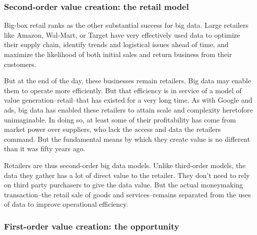 \documentclass[12pt]{article}
\begin{document}
\subsubsection{Second-order value creation: the retail model}
\label{sec:second-order-value}


Big-box retail ranks as the other substantial success for big
data. Large retailers like Amazon, Wal-Mart, or Target have very
effectively used data to optimize their supply chain, identify trends
and logistical issues ahead of time, and maximize the likelihood of
both initial sales and return business from their customers. 

But at the end of the day, these businesses remain retailers. Big data
may enable them to operate more efficiently. But that efficiency is in
service of a model of value generation--retail--that has existed for a
very long time. As with Google and ads, big data has enabled these
retailers to attain scale and complexity heretofore unimaginable. In
doing so, at least some of their profitability has come from market
power over suppliers, who lack the access and data the retailers
command. But the fundamental means by which they create value is no
different than it was fifty years ago.

Retailers are thus second-order big data models. Unlike third-order
models, the data they gather has a lot of direct value to the
retailer. They don't need to rely on third party purchasers to give
the data value. But the actual moneymaking transaction--the retail
sale of goods and services--remains separated from the uses of data to
improve operational efficiency. 



\subsubsection{First-order value creation: the opportunity}
\label{sec:first-order-value}
\end{document}
